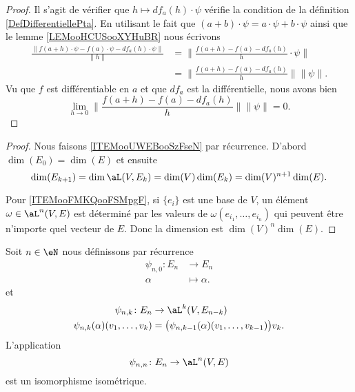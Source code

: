 \begin{proof}
	Il s'agit de vérifier que \( h\mapsto df_a(h)\cdot \psi\) vérifie la condition de la définition \ref{DefDifferentiellePta}. En utilisant le fait que \( (a+b)\cdot \psi = a\cdot \psi+b\cdot \psi\) ainsi que le lemme \ref{LEMooHCUSooXYHuBR} nous écrivons
	\begin{subequations}
		\begin{align}
			\frac{ \| f(a+h)\cdot \psi-f(a)\cdot\psi-df_a(h)\cdot \psi\|  }{ \| h \| } & =\| \frac{ f(a+h)-f(a)-df_a(h) }{ h  }\cdot \psi\|  \\
			                                                                           & =\| \frac{ f(a+h)-f(a)-df_a(h) }{ h } \|\| \psi \|.
		\end{align}
	\end{subequations}
	Vu que \( f\) est différentiable en \( a\) et que \( df_a\) est la différentielle, nous avons bien
	\begin{equation}
		\lim_{h\to 0}  \| \frac{ f(a+h)-f(a)-df_a(h) }{ h } \|\| \psi \|=0.
	\end{equation}
\end{proof}


\begin{proof}
	Nous faisons \ref{ITEMooUWEBooSzFseN} par récurrence. D'abord \( \dim(E_0)=\dim(E)\) et ensuite
	\begin{equation}
		\dim(E_{k+1})=\dim\aL(V,E_k)=\dim(V)\dim(E_k)=\dim(V)^{n+1}\dim(E).
	\end{equation}

	Pour \ref{ITEMooFMKQooFSMpgF}, si \( \{ e_i \}\) est une base de \( V\), un élément \( \omega\in \aL^n(V,E)\) est déterminé par les valeurs de \( \omega(e_{i_1},\ldots, e_{i_n})\) qui peuvent être n'importe quel vecteur de \( E\). Donc la dimension est \( \dim(V)^n\dim(E)\).
\end{proof}

\begin{lemma}
	Soit \( n\in \eN\) nous définissons par récurrence
	\begin{equation}
		\begin{aligned}
			\psi_{n,0}\colon E_n & \to E_n         \\
			\alpha               & \mapsto \alpha.
		\end{aligned}
	\end{equation}
	et
	\begin{equation}
		\begin{aligned}
			\psi_{n,k}\colon E_n                & \to \aL^k(V,E_{n-k})                                       \\
			\psi_{n,k}(\alpha)(v_1,\ldots, v_k) & =\big( \psi_{n,k-1}(\alpha)(v_1,\ldots, v_{k-1}) \big)v_k.
		\end{aligned}
	\end{equation}
	L'application
	\begin{equation}
		\psi_{n,n}\colon E_n\to \aL^n(V,E)
	\end{equation}
	est un isomorphisme isométrique.
\end{lemma}

